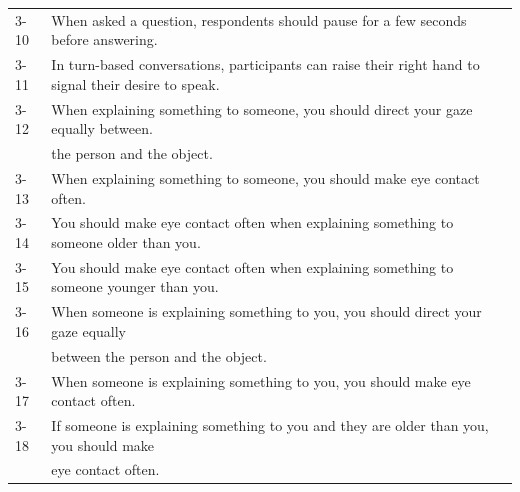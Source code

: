 \documentclass{CSSRforAfrica}
\begin{document}
\begin{table}[H]
\begin{center}
\begin{tabularx}{\linewidth}{|l |X|}
\vspace{-0.2mm} {\small 3-10 }  & {\small When asked a question, respondents should pause for a few seconds before answering.}\\

\vspace{-0.2mm} {\small 3-11 }   & {\small In turn-based conversations, participants can raise their right hand to signal their desire to speak.}\\

\vspace{-0.2mm} {\small 3-12 }  & {\small When explaining something to someone, you should direct your gaze equally between.}\\
\vspace{-0.2mm} {\small  }  & {\small the person and the object.}\\

\vspace{-0.2mm} {\small 3-13 } & {\small When explaining something to someone, you should make eye contact often.}\\

\vspace{-0.2mm} {\small 3-14 }  & {\small You should make eye contact  often when explaining something to someone older than you.}\\

\vspace{-0.2mm} {\small 3-15 }  & {\small You should make eye contact  often when explaining something to someone younger than you.}\\

\vspace{-0.2mm} {\small 3-16 }  & {\small When someone is explaining something to you, you should direct your gaze equally }\\
\vspace{-0.2mm} {\small }  & {\small   between the person and the object.}\\

\vspace{-0.2mm} {\small 3-17 } & {\small When someone is explaining something to you, you should make eye contact often.}\\

\vspace{-0.2mm} {\small 3-18 }  & {\small If someone is explaining something to you and they are older than you, you should make}\\
\vspace{-0.2mm} {\small  }  & {\small   eye contact  often.}\\



\end{tabularx}
\end{center}
\end{table}
\end{document}
